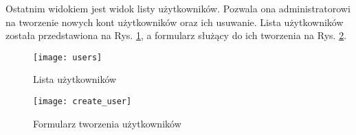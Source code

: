 Ostatnim widokiem jest widok listy użytkowników. Pozwala ona administratorowi na tworzenie
nowych kont użytkowników oraz ich usuwanie. Lista użytkowników została przedstawiona
na Rys. \ref{users}, a formularz służący do ich tworzenia na Rys. \ref{create_user}.
\begin{figure}[h!]
  \centering
  \texttt{[image: users]}
  \caption{Lista użytkowników}
  \label{users}
\end{figure}
\begin{figure}[h!]
  \centering
  \texttt{[image: create\_user]}
  \caption{Formularz tworzenia użytkowników}
  \label{create_user}
\end{figure}

